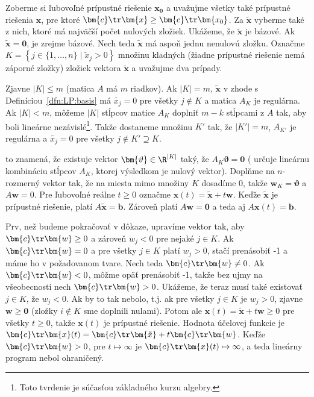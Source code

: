 \begin{dokaz}
Zoberme si ľubovoľné prípustné riešenie $\bm{x_0}$ a uvažujme všetky také
prípustné riešenia $\bm{x}$, pre ktoré $\bm{c}\tr\bm{x}\ge\bm{c}\tr\bm{x_0}$.
Za $\bm{\tilde{x}}$ vyberme také z nich, ktoré má najväčší počet nulových
zložiek.  Ukážeme, že $\bm{\tilde{x}}$ je bázové.  Ak $\bm{\tilde{x}}=\bm{0}$,
je zrejme bázové. Nech teda $\bm{\tilde{x}}$ má aspoň jednu nenulovú zložku.
Označme $K=\left\{j\in\{1,\ldots,n\}\mid\tilde{x}_j>0\right\}$ množinu kladných
(žiadne prípustné riešenie nemá záporné zložky) zložiek vektora
$\bm{\tilde{x}}$ a uvažujme dva prípady.

 Zjavne $|K|\le m$
(matica $A$ má $m$ riadkov). Ak $|K|=m$, $\bm{\tilde{x}}$ v zhode s
Definíciou~\ref{dfn:LP:basis} má $\tilde{x_j}=0$ pre všetky $j\not\in K$ a
matica $A_K$ je regulárna. Ak $|K|<m$, môžeme $|K|$ stĺpcov matice $A_K$
doplniť $m-k$ stĺpcami z $A$ tak, aby boli lineárne nezávislé\footnote{Toto
tvrdenie je súčasťou základného kurzu algebry.}.  Takže dostaneme množinu $K'$
tak, že $|K'|=m$, $A_{K'}$ je regulárna a   $\tilde{x_j}=0$ pre všetky
$j\not\in K'\supseteq K$.

 to znamená, že existuje
vektor $\bm{\vartheta}\in\R^{|K|}$ taký, že $A_K\bm{\vartheta}=\bm{0}$
(\bm{\vartheta} určuje lineárnu kombináciu stĺpcov $A_K$, ktorej výsledkom je
nulový vektor).  Doplňme \bm{\vartheta} na $n$-rozmerný vektor  tak, že
na miesta mimo množiny $K$ dosadíme 0, takže $\bm{w}_K=\bm{\vartheta}$ a
$A\bm{w}=0$.  Pre ľubovoľné reálne $t\ge0$ označme
$\bm{x}(t)=\bm{\tilde{x}}+t\bm{w}$.  Keďže $\bm{\tilde{x}}$ je prípustné
riešenie, platí $A\bm{\tilde{x}}=\bm{b}$. Zároveň platí $A\bm{w}=\bm{0}$ a teda
aj $A\bm{x}(t)=\bm{b}$.

Prv, než budeme pokračovať v dôkaze, upravíme vektor  tak, aby
$\bm{c}\tr\bm{w}\ge0$ a zároveň $w_j<0$ pre nejaké $j\in K$.  Ak
$\bm{c}\tr\bm{w}=0$ a pre všetky $j\in K$ platí  $w_j>0$, stačí 
prenásobiť -1 a máme ho v požadovanom tvare. Nech teda $\bm{c}\tr\bm{w}\not=0$.
Ak  $\bm{c}\tr\bm{w}<0$, môžme opäť  prenásobiť -1, takže bez ujmy na
všeobecnosti nech $\bm{c}\tr\bm{w}>0$. Ukážeme, že teraz musí také existovať
$j\in K$, že $w_j<0$. Ak by to tak nebolo, t.j. ak pre všetky $j\in K$ je
$w_j>0$, zjavne $\bm{w}\ge\bm{0}$ (zložky $i\not\in K$ sme doplnili nulami).
Potom ale $\bm{x}(t)=\bm{\tilde{x}}+t\bm{w}\ge0$ pre všetky $t\ge0$, takže
$\bm{x}(t)$ je prípustné riešenie. Hodnota účelovej funkcie je
$\bm{c}\tr\bm{x}(t)=\bm{c}\tr\bm{\tilde{x}}+t\bm{c}\tr\bm{w}$. Keďže
$\bm{c}\tr\bm{w}>0$, pre $t\mapsto\infty$ je $\bm{c}\tr\bm{x}(t)\mapsto\infty$,
a teda lineárny program nebol ohraničený.


\end{dokaz}
